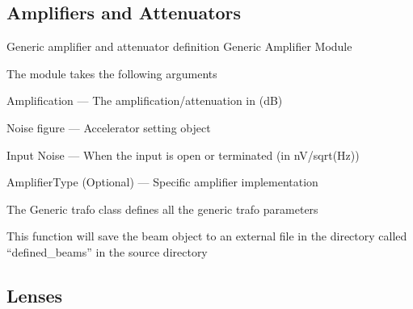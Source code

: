 \documentclass[letterpaper,10pt,english]{sphinxmanual}
\begin{document}
\subsection{Amplifiers and Attenuators}
\label{common_modules:amplifiers-and-attenuators}
Generic amplifier and attenuator definition
\label{common_modules:module-AmpAttModule}
Generic Amplifier Module

The module takes the following arguments

Amplification --- The amplification/attenuation in (dB)

Noise figure --- Accelerator setting object

Input Noise --- When the input is open or terminated (in nV/sqrt(Hz))

AmplifierType (Optional) --- Specific amplifier implementation

\begin{fulllineitems}
\label{common_modules:AmpAttModule.genericAmpAtt}
The Generic trafo class defines all the generic trafo parameters

\begin{fulllineitems}
\label{common_modules:AmpAttModule.genericAmpAtt.save}
This function will save the beam object to an external file in the directory called ``defined\_beams'' in the source directory

\end{fulllineitems}


\end{fulllineitems}



\subsection{Lenses}
\label{common_modules:lenses}
\end{document}
